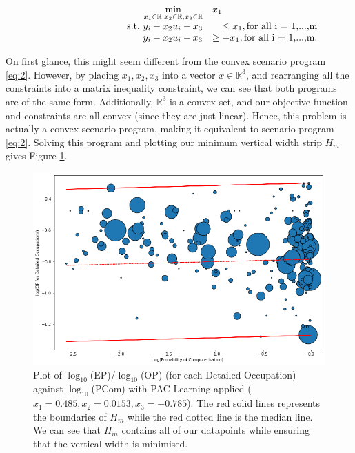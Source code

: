 \documentclass[11pt]{article}
\begin{document}
\begin{align}
	\label{eq:5}
	\begin{array}{rrclcl}
	\displaystyle \min_{x_{1} \in \mathbb{R},x_{2} \in \mathbb{R},x_{3} \in \mathbb{R}}&  \multicolumn{3}{l}{x_{1}}&\\
	\textrm{s.t.}\  y_{i} - x_{2}u_{i} - x_{3} &\leq x_{1}, \text{for all i = 1,...,m}&\\
	y_{i} - x_{2}u_{i} - x_{3} &\geq -x_{1}, \text{for all i = 1,...,m}.&\\
	\end{array}
\end{align}

On first glance, this might seem different from the convex scenario program \ref{eq:2}. However, by placing $x_{1},x_{2},x_{3}$ into a vector $x \in \mathbb{R}^{3}$, and rearranging all the constraints into a matrix inequality constraint, we can see that both programs are of the same form. Additionally, $\mathbb{R}^{3}$ is a convex set, and our objective function and constraints are all convex (since they are just linear). Hence, this problem is actually a convex scenario program, making it equivalent to scenario program \ref{eq:2}. Solving this program and plotting our minimum vertical width strip $H_{m}$ gives Figure \ref{fig:pac}.


\begin{figure}[!htb]
	\centering
	\includegraphics[width=15cm]{Figures/pac.png}
	\caption{Plot of $\log_{10}$(EP)/$\log_{10}$(OP) (for each Detailed Occupation) against $\log_{10}$(PCom) with PAC Learning applied ($x_{1}=0.485, x_{2}=0.0153, x_{3}=-0.785$). The red solid lines represents the boundaries of $H_{m}$ while the red dotted line is the median line. We can see that $H_{m}$ contains all of our datapoints while ensuring that the vertical width is minimised.}
	\label{fig:pac}
\end{figure}
\end{document}

